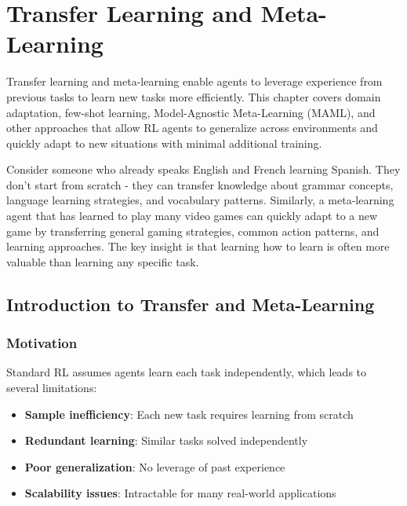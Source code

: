 \chapter{Transfer Learning and Meta-Learning}
\label{ch:transfer-meta-learning}

\begin{keyideabox}
Transfer learning and meta-learning enable agents to leverage experience from previous tasks to learn new tasks more efficiently. This chapter covers domain adaptation, few-shot learning, Model-Agnostic Meta-Learning (MAML), and other approaches that allow RL agents to generalize across environments and quickly adapt to new situations with minimal additional training.
\end{keyideabox}

\begin{intuitionbox}
Consider someone who already speaks English and French learning Spanish. They don't start from scratch - they can transfer knowledge about grammar concepts, language learning strategies, and vocabulary patterns. Similarly, a meta-learning agent that has learned to play many video games can quickly adapt to a new game by transferring general gaming strategies, common action patterns, and learning approaches. The key insight is that learning how to learn is often more valuable than learning any specific task.
\end{intuitionbox}

\section{Introduction to Transfer and Meta-Learning}

\subsection{Motivation}

Standard RL assumes agents learn each task independently, which leads to several limitations:

\begin{itemize}
    \item \textbf{Sample inefficiency}: Each new task requires learning from scratch
    \item \textbf{Redundant learning}: Similar tasks solved independently
    \item \textbf{Poor generalization}: No leverage of past experience
    \item \textbf{Scalability issues}: Intractable for many real-world applications
\end{itemize}

